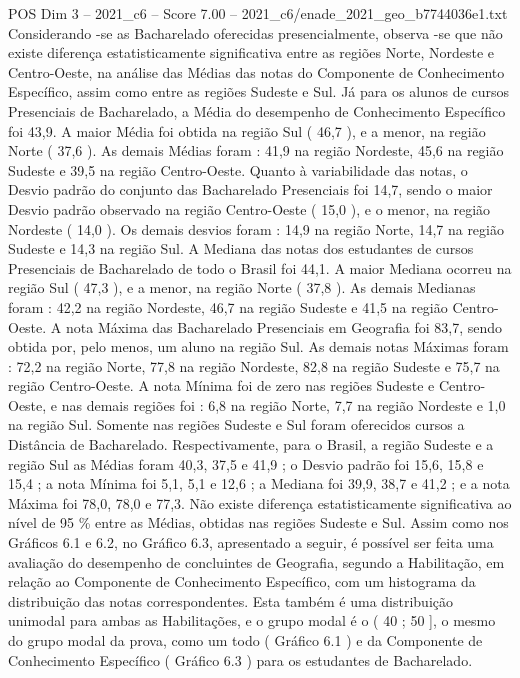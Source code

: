 \begin{textsample}{POS Dim 3 – 2021\_c6 – Score 7.00 – 2021\_c6/enade\_2021\_geo\_b7744036e1.txt}
Considerando -se as Bacharelado oferecidas presencialmente, observa -se que não existe diferença estatisticamente significativa entre as regiões Norte, Nordeste e Centro-Oeste, na análise das Médias das notas do Componente de Conhecimento Específico, assim como entre as regiões Sudeste e Sul.
Já para os alunos de cursos Presenciais de Bacharelado, a Média do desempenho de Conhecimento Específico foi 43,9.
A maior Média foi obtida na região Sul ( 46,7 ), e a menor, na região Norte ( 37,6 ).
As demais Médias foram : 41,9 na região Nordeste, 45,6 na região Sudeste e 39,5 na região Centro-Oeste.
Quanto à variabilidade das notas, o Desvio padrão do conjunto das Bacharelado Presenciais foi 14,7, sendo o maior Desvio padrão observado na região Centro-Oeste ( 15,0 ), e o menor, na região Nordeste ( 14,0 ).
Os demais desvios foram : 14,9 na região Norte, 14,7 na região Sudeste e 14,3 na região Sul.
A Mediana das notas dos estudantes de cursos Presenciais de Bacharelado de todo o Brasil foi 44,1.
A maior Mediana ocorreu na região Sul ( 47,3 ), e a menor, na região Norte ( 37,8 ).
As demais Medianas foram : 42,2 na região Nordeste, 46,7 na região Sudeste e 41,5 na região Centro-Oeste.
A nota Máxima das Bacharelado Presenciais em Geografia foi 83,7, sendo obtida por, pelo menos, um aluno na região Sul.
As demais notas Máximas foram : 72,2 na região Norte, 77,8 na região Nordeste, 82,8 na região Sudeste e 75,7 na região Centro-Oeste.
A nota Mínima foi de zero nas regiões Sudeste e Centro-Oeste, e nas demais regiões foi : 6,8 na região Norte, 7,7 na região Nordeste e 1,0 na região Sul.
Somente nas regiões Sudeste e Sul foram oferecidos cursos a Distância de Bacharelado.
Respectivamente, para o Brasil, a região Sudeste e a região Sul as Médias foram 40,3, 37,5 e 41,9 ; o Desvio padrão foi 15,6, 15,8 e 15,4 ; a nota Mínima foi 5,1, 5,1 e 12,6 ; a Mediana foi 39,9, 38,7 e 41,2 ; e a nota Máxima foi 78,0, 78,0 e 77,3.
Não existe diferença estatisticamente significativa ao nível de 95 \% entre as Médias, obtidas nas regiões Sudeste e Sul.
Assim como nos Gráficos 6.1 e 6.2, no Gráfico 6.3, apresentado a seguir, é possível ser feita uma avaliação do desempenho de concluintes de Geografia, segundo a Habilitação, em relação ao Componente de Conhecimento Específico, com um histograma da distribuição das notas correspondentes.
Esta também é uma distribuição unimodal para ambas as Habilitações, e o grupo modal é o ( 40 ; 50 ], o mesmo do grupo modal da prova, como um todo ( Gráfico 6.1 ) e da Componente de Conhecimento Específico ( Gráfico 6.3 ) para os estudantes de Bacharelado.

\end{textsample}
